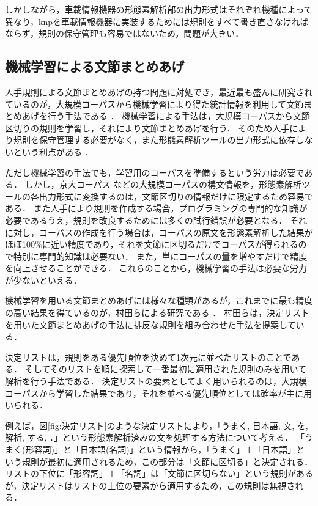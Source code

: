 しかしながら，車載情報機器の形態素解析部の出力形式はそれぞれ機種によって異なり，knpを車載情報機器に実装するためには規則をすべて書き直さなければならず，規則の保守管理も容易ではないため，問題が大きい．


\subsection{機械学習による文節まとめあげ}\label{subsec:機械学習手法}

人手規則による文節まとめあげの持つ問題に対処でき，最近最も盛んに研究されているのが，大規模コーパスから機械学習により得た統計情報を利用して文節まとめあげを行う手法である
\cite{Zhang1998,Asahara1999,Murata2000}
．
機械学習による手法は，大規模コーパスから文節区切りの規則を学習し，それにより文節まとめあげを行う．
そのため人手により規則を保守管理する必要がなく，また形態素解析ツールの出力形式に依存しないという利点がある
．

ただし機械学習の手法でも，学習用のコーパスを準備するという労力は必要である．
しかし，京大コーパス
\cite{KyotoCorpus}
などの大規模コーパスの構文情報を，形態素解析ツールの各出力形式に変換するのは，文節区切りの情報だけに限定するため容易である．
また人手により規則を作成する場合，プログラミングの専門的な知識が必要であるうえ，規則を改良するためには多くの試行錯誤が必要となる．
それに対し，コーパスの作成を行う場合は，コーパスの原文を形態素解析した結果がほぼ100\%に近い精度であり，それを文節に区切るだけでコーパスが得られるので特別に専門的知識は必要ない．
また，単にコーパスの量を増やすだけで精度を向上させることができる．
これらのことから，機械学習の手法は必要な労力が少ないといえる．

機械学習を用いる文節まとめあげには様々な種類があるが，これまでに最も精度の高い結果を得ているのが，村田らによる研究である
\cite{Murata2000}
．
村田らは，決定リストを用いた文節まとめあげの手法に排反な規則を組み合わせた手法を提案している．

決定リストは，規則をある優先順位を決めて1次元に並べたリストのことである．
そしてそのリストを順に探索して一番最初に適用された規則のみを用いて解析を行う手法である．
決定リストの要素としてよく用いられるのは，大規模コーパスから学習した結果であり，それを並べる優先順位としては確率が主に用いられる．

例えば，図\ref{fig:決定リスト}のような決定リストにより，「うまく, 日本語, 文, を, 解析, する, ．」という形態素解析済みの文を処理する方法について考える．
「うまく(形容詞)」と「日本語(名詞)」という情報から，「うまく」＋「日本語」という規則が最初に適用されるため，この部分は「文節に区切る」と決定される．
リストの下位に「形容詞」＋「名詞」は「文節に区切らない」という規則があるが，決定リストはリストの上位の要素から適用するため，この規則は無視される．

